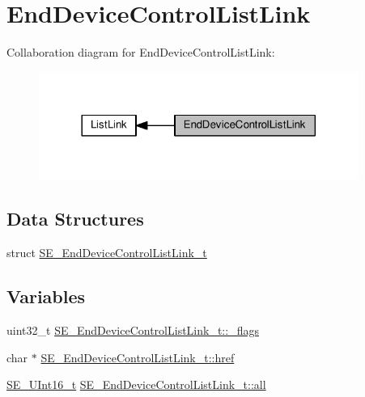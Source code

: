 \hypertarget{group__EndDeviceControlListLink}{}\section{End\+Device\+Control\+List\+Link}
\label{group__EndDeviceControlListLink}
Collaboration diagram for End\+Device\+Control\+List\+Link\+:\nopagebreak
\begin{figure}[H]
\begin{center}
\leavevmode
\includegraphics[width=296pt]{group__EndDeviceControlListLink}
\end{center}
\end{figure}
\subsection*{Data Structures}
\begin{DoxyCompactItemize}
\item 
struct \hyperlink{structSE__EndDeviceControlListLink__t}{S\+E\+\_\+\+End\+Device\+Control\+List\+Link\+\_\+t}
\end{DoxyCompactItemize}
\subsection*{Variables}
\begin{DoxyCompactItemize}
\item 
uint32\+\_\+t \hyperlink{group__EndDeviceControlListLink_gac8b545f4be968f1fc37a72590fc41aee}{S\+E\+\_\+\+End\+Device\+Control\+List\+Link\+\_\+t\+::\+\_\+flags}
\item 
char $\ast$ \hyperlink{group__EndDeviceControlListLink_gad0d8d1cc17c6e6bc8ccc865b312ace64}{S\+E\+\_\+\+End\+Device\+Control\+List\+Link\+\_\+t\+::href}
\item 
\hyperlink{group__UInt16_gac68d541f189538bfd30cfaa712d20d29}{S\+E\+\_\+\+U\+Int16\+\_\+t} \hyperlink{group__EndDeviceControlListLink_ga656a30b9a25ba0e7c4a900517700b30b}{S\+E\+\_\+\+End\+Device\+Control\+List\+Link\+\_\+t\+::all}
\end{DoxyCompactItemize}


